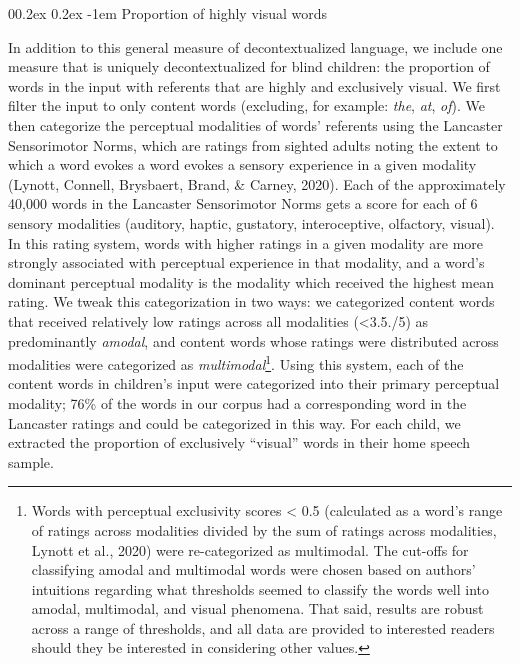 \documentclass[
  man,floatsintext]{apa6}
\makeatletter
\let\oldparagraph\paragraph
\renewcommand{\paragraph}[1]{\oldparagraph{#1}\mbox{}}
\renewcommand{\paragraph}{\@startsection{paragraph}{4}{\parindent}%
  {0\baselineskip \@plus 0.2ex \@minus 0.2ex}%
  {-1em}%
  {\normalfont\normalsize\bfseries\itshape\typesectitle}}
\makeatother
\begin{document}
\hypertarget{proportion-of-highly-visual-words}{%
\paragraph{Proportion of highly visual words}\label{proportion-of-highly-visual-words}}

In addition to this general measure of decontextualized language, we include one measure that is uniquely decontextualized for blind children: the proportion of words in the input with referents that are highly and exclusively visual. We first filter the input to only content words (excluding, for example: \emph{the}, \emph{at}, \emph{of}). We then categorize the perceptual modalities of words' referents using the Lancaster Sensorimotor Norms, which are ratings from sighted adults noting the extent to which a word evokes a word evokes a sensory experience in a given modality (Lynott, Connell, Brysbaert, Brand, \& Carney, 2020). Each of the approximately 40,000 words in the Lancaster Sensorimotor Norms gets a score for each of 6 sensory modalities (auditory, haptic, gustatory, interoceptive, olfactory, visual). In this rating system, words with higher ratings in a given modality are more strongly associated with perceptual experience in that modality, and a word's dominant perceptual modality is the modality which received the highest mean rating. We tweak this categorization in two ways: we categorized content words that received relatively low ratings across all modalities (\textless3.5./5) as predominantly \emph{amodal}, and content words whose ratings were distributed across modalities were categorized as \emph{multimodal}\footnote{Words with perceptual exclusivity scores \textless{} 0.5 (calculated as a word's range of ratings across modalities divided by the sum of ratings across modalities, Lynott et al., 2020) were re-categorized as multimodal. The cut-offs for classifying amodal and multimodal words were chosen based on authors' intuitions regarding what thresholds seemed to classify the words well into amodal, multimodal, and visual phenomena. That said, results are robust across a range of thresholds, and all data are provided to interested readers should they be interested in considering other values.}. Using this system, each of the content words in children's input were categorized into their primary perceptual modality; 76\% of the words in our corpus had a corresponding word in the Lancaster ratings and could be categorized in this way. For each child, we extracted the proportion of exclusively ``visual'' words in their home speech sample.
\end{document}
